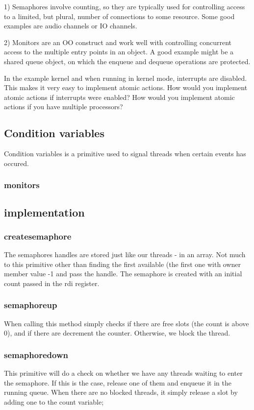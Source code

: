 1) Semaphores involve counting, so they are typically used for 
controlling
   access to a limited, but plural, number of connections to some 
resource.
   Some good examples are audio channels or IO channels.

2) Monitors are an OO construct and work well with controlling 
concurrent
   access to the multiple entry points in an object. A good example 
might
   be a shared queue object, on which the enqueue and dequeue operations
   are protected.



 In the example kernel and when running in kernel mode, interrupts are disabled. This
makes it very easy to implement atomic actions. How would you implement atomic
actions if interrupts were enabled? How would you implement atomic actions if you
have multiple processors?

\subsection{Condition variables}
Condition variables is a primitive used to signal threads when certain events has occured.
\subsubsection{monitors}

\subsection{implementation}
\subsubsection*{createsemaphore}
The semaphores handles are stored just like our threads - in an array. Not much to this primitive other than finding the first available (the first one with owner member value -1 and pass the handle. The semaphore is created with an initial count passed in the rdi register.
\subsubsection*{semaphoreup}
When calling this method simply checks if there are free slots (the count is above 0), and if there are decrement the counter. Otherwise, we block the thread.
\subsubsection*{semaphoredown}
This primitive will do a check on whether we have any threads waiting to enter the semaphore. If this is the case, release one of them and enqueue it in the running queue. When there are no blocked threads, it simply release a slot by adding one to the count variable;

